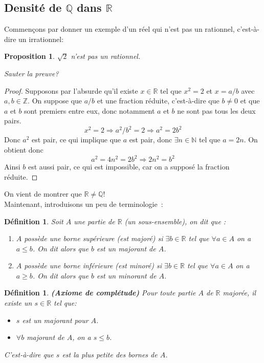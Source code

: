 \documentclass[a4paper, 12pt, french, twoside]{article}
\newtheorem{proposition}[theorem]{Proposition}
\newtheorem{defi}[theorem]{Définition}
\newcommand{\Nn}{{\mathbb{N}}}
\newcommand{\Zz}{{\mathbb{Z}}}
\newcommand{\Rr}{{\mathbb{R}}}
\newcommand{\Qq}{{\mathbb{Q}}}
\begin{document}
\subsection{Densité de $\Qq$ dans $\Rr$}
Commençons par donner un exemple d'un réel qui n'est pas un rationnel, c'est-à-dire un irrationnel: 
\begin{proposition}
    $\sqrt{2}$ n'est pas un rationnel. 
\end{proposition}
\textit{Sauter la preuve?}
\begin{proof}
   Supposons par l'absurde qu'il existe $x\in \Rr$ tel que $x^2=2$ et $x=a/b$ avec $a,b \in \Zz$. On suppose que $a/b$ et une fraction réduite, c'est-à-dire que $b\neq 0$ et que $a$ et $b$ sont premiers entre eux, donc notamment $a$ et $b$ ne sont pas tous les deux pairs. 
   $$x^2=2 \Rightarrow a^2/b^2=2 \Rightarrow a^2=2b^2$$
   Donc $a^2$ est pair, ce qui implique que $a$ est pair, donc $\exists n \in \Nn$ tel que $a=2n$. On obtient donc $$a^2=4n^2=2b^2 \Rightarrow 2n^2=b^2$$
   Ainsi $b$ est aussi pair, ce qui est impossible, car on a supposé la fraction réduite. 
\end{proof}
On vient de montrer que $\Rr \neq \Qq$!\\
Maintenant, introduisons un peu de terminologie : 
\begin{defi}
    Soit $A$ une partie de $\Rr$ (un sous-ensemble), on dit que : 
    \begin{enumerate}
        \item $A$ possède une borne supérieure (est majoré) si $\exists b \in \Rr $ tel que $\forall a \in A$ on a $a\leq b$. On dit alors que $b$ est un majorant de $A$. 
        \item $A$ possède une borne inférieure (est minoré) si $\exists b \in \Rr $ tel que $\forall a \in A$ on a $a\geq b$. On dit alors que $b$ est un minorant de $A$. 
    \end{enumerate}   
\end{defi}
\begin{defi}
    
\textbf{(Axiome de complétude)}  Pour toute partie $A$ de $\Rr$ majorée, il existe un $s\in \Rr$ tel que: 
\begin{itemize}
    \item $s$ est un majorant pour $A$.
    \item $\forall b$ majorant de $A$, on a $s\leq b$.
\end{itemize}
C'est-à-dire que $s$ est la plus petite des bornes de $A$.
\end{defi}
\end{document}
